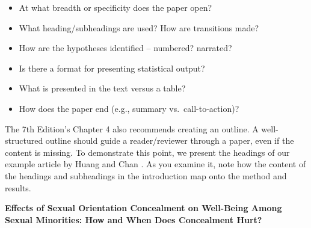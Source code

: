 \documentclass[
  11pt,
]{book}
\providecommand{\tightlist}{%
  \setlength{\itemsep}{0pt}\setlength{\parskip}{0pt}}
\begin{document}
\begin{itemize}
\tightlist
\item
  At what breadth or specificity does the paper open?\\
\item
  What heading/subheadings are used? How are transitions made?
\item
  How are the hypotheses identified -- numbered? narrated?
\item
  Is there a format for presenting statistical output?
\item
  What is presented in the text versus a table?
\item
  How does the paper end (e.g., summary vs.~call-to-action)?
\end{itemize}

The 7th Edition's Chapter 4 also recommends creating an outline. A well-structured outline should guide a reader/reviewer through a paper, even if the content is missing. To demonstrate this point, we present the headings of our example article by Huang and Chan \citeyearpar{huang_effects_2022}. As you examine it, note how the content of the headings and subheadings in the introduction map onto the method and results.

\textbf{Effects of Sexual Orientation Concealment on Well-Being Among Sexual Minorities: How and When Does Concealment Hurt?}
\end{document}
